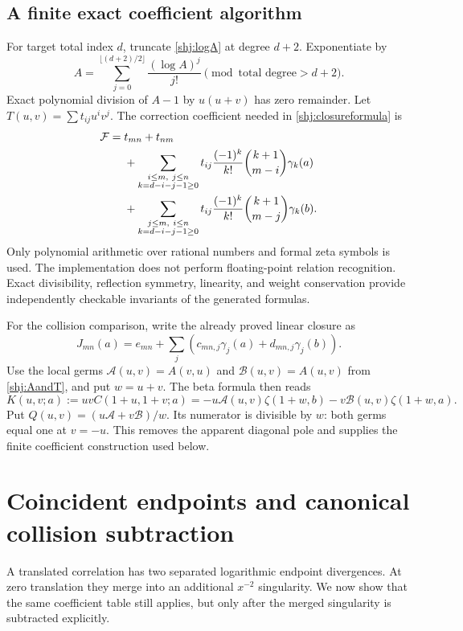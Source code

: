 \subsection{A finite exact coefficient algorithm}
For target total index $d$, truncate \eqref{shj:logA} at degree $d+2$. Exponentiate by
\[
A=\sum_{j=0}^{\lfloor(d+2)/2\rfloor}\frac{(\log A)^j}{j!}
\pmod{\text{total degree}>d+2}.
\]
Exact polynomial division of $A-1$ by $u(u+v)$ has zero remainder. Let
$T(u,v)=\sum t_{ij}u^iv^j$. The correction coefficient needed in \eqref{shj:closureformula} is
\begin{align}
[u^mv^n]\mathcal F={}&t_{mn}+t_{nm}\notag\\
&+\sum_{\substack{i\le m,\ j\le n\\k=d-i-j-1\ge0}}
 t_{ij}\frac{(-1)^k}{k!}\binom{k+1}{m-i}\gamma_k(a)\notag\\
&+\sum_{\substack{j\le m,\ i\le n\\k=d-i-j-1\ge0}}
 t_{ij}\frac{(-1)^k}{k!}\binom{k+1}{m-j}\gamma_k(b).
\label{shj:coefficientalgorithm}
\end{align}
Only polynomial arithmetic over rational numbers and formal zeta symbols is used. The implementation does not perform floating-point relation recognition. Exact divisibility, reflection symmetry, linearity, and weight conservation provide independently checkable invariants of the generated formulas.


\providecommand{\scollCoeff}[1]{[#1]}
For the collision comparison, write the already proved linear closure as
\[
 J_{mn}(a)=e_{mn}+\sum_j(c_{mn,j}\gamma_j(a)+d_{mn,j}\gamma_j(b)).
\]
Use the local germs $\mathcal A(u,v)=A(v,u)$ and
$\mathcal B(u,v)=A(u,v)$ from \eqref{shj:AandT}, and put $w=u+v$.
The beta formula then reads
\begin{equation}\label{scoll:eq:kernel}
 K(u,v;a):=uv C(1+u,1+v;a)
 =-u\mathcal A(u,v)\zeta(1+w,b)-v\mathcal B(u,v)\zeta(1+w,a).
\end{equation}
Put $Q(u,v)=(u\mathcal A+v\mathcal B)/w$. Its numerator is divisible by $w$:
both germs equal one at $v=-u$. This removes the apparent diagonal
pole and supplies the finite coefficient construction used below.
\section{Coincident endpoints and canonical collision subtraction}
\label{scoll:sec:coincident}

A translated correlation has two separated logarithmic endpoint
divergences. At zero translation they merge into an additional
$x^{-2}$ singularity. We now show that the same coefficient table still
applies, but only after the merged singularity is subtracted explicitly.

